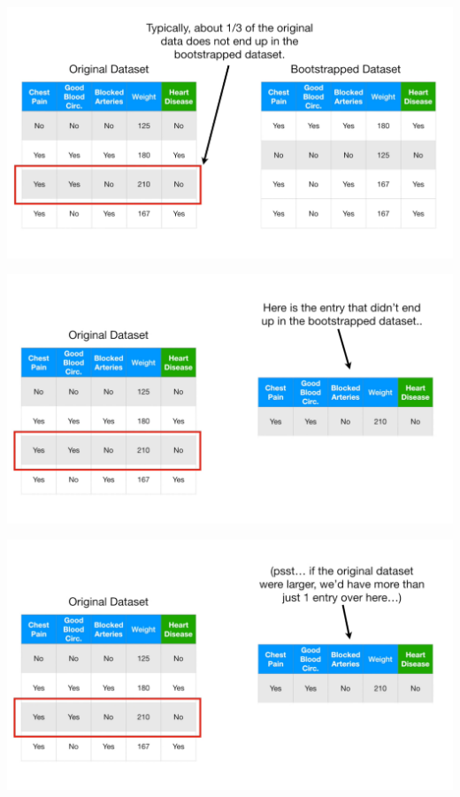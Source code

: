 \documentclass[
  ignorenonframetext,
]{beamer}
\begin{document}
\begin{frame}{}
\protect\hypertarget{section-68}{}
\includegraphics{images/r69.png}
\end{frame}

\begin{frame}{}
\protect\hypertarget{section-69}{}
\includegraphics{images/r70.png}
\end{frame}

\begin{frame}{}
\protect\hypertarget{section-70}{}
\includegraphics{images/r71.png}
\end{frame}
\end{document}
